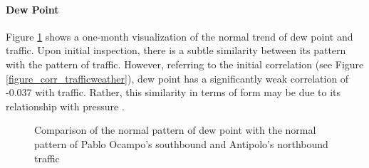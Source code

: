 
\paragraph{Dew Point}

Figure \ref{figure_traffic_vs_dewpoint} shows a one-month visualization of the normal trend of dew point and traffic. Upon initial inspection, there is a subtle similarity between its pattern with the pattern of traffic. However, referring to the initial correlation (see Figure \ref{figure_corr_trafficweather}), dew point has a significantly weak correlation of -0.037 with traffic. Rather, this similarity in terms of form may be due to its relationship with pressure .

\begin{figure}[h] 
\centering
    \centering
      \captionsetup{justification=centering}
    \hfill
    \caption{Comparison of the normal pattern of dew point with the normal pattern of Pablo Ocampo’s southbound and Antipolo’s northbound traffic}

    \label{figure_traffic_vs_dewpoint}
\end{figure}



